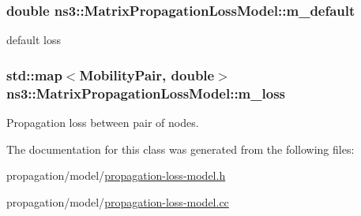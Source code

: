 \subsubsection[{\texorpdfstring{m\+\_\+default}{m_default}}]{\setlength{\rightskip}{0pt plus 5cm}double ns3\+::\+Matrix\+Propagation\+Loss\+Model\+::m\+\_\+default\hspace{0.3cm}{\ttfamily [private]}}\hypertarget{classns3_1_1MatrixPropagationLossModel_aca9dd39c9cab68ac833fd1c1398bf1ff}{}\label{classns3_1_1MatrixPropagationLossModel_aca9dd39c9cab68ac833fd1c1398bf1ff}


default loss 

\subsubsection[{\texorpdfstring{m\+\_\+loss}{m_loss}}]{\setlength{\rightskip}{0pt plus 5cm}std\+::map$<${\bf Mobility\+Pair}, double$>$ ns3\+::\+Matrix\+Propagation\+Loss\+Model\+::m\+\_\+loss\hspace{0.3cm}{\ttfamily [private]}}\hypertarget{classns3_1_1MatrixPropagationLossModel_af3e8cac671db25139cc6b5f5192bcad5}{}\label{classns3_1_1MatrixPropagationLossModel_af3e8cac671db25139cc6b5f5192bcad5}


Propagation loss between pair of nodes. 



The documentation for this class was generated from the following files\+:\begin{DoxyCompactItemize}
\item 
propagation/model/\hyperlink{propagation-loss-model_8h}{propagation-\/loss-\/model.\+h}\item 
propagation/model/\hyperlink{propagation-loss-model_8cc}{propagation-\/loss-\/model.\+cc}\end{DoxyCompactItemize}
